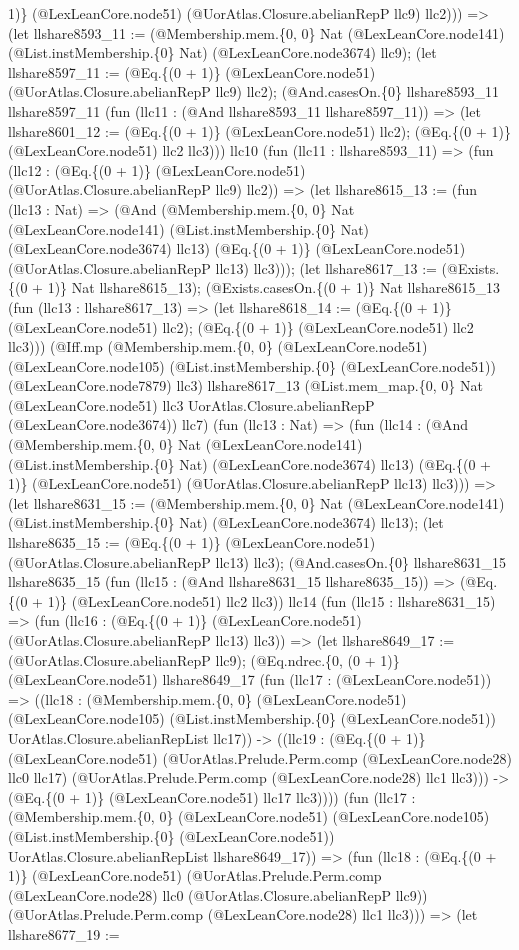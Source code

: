 \documentclass[11pt]{article}
\begin{document}
1)\} (@LexLeanCore.node51) (@UorAtlas.Closure.abelianRepP llc9) llc2))) => (let llshare8593\_11 := (@Membership.mem.\{0, 0\} Nat (@LexLeanCore.node141) (@List.instMembership.\{0\} Nat) (@LexLeanCore.node3674) llc9); (let llshare8597\_11 := (@Eq.\{(0 + 1)\} (@LexLeanCore.node51) (@UorAtlas.Closure.abelianRepP llc9) llc2); (@And.casesOn.\{0\} llshare8593\_11 llshare8597\_11 (fun (llc11 : (@And llshare8593\_11 llshare8597\_11)) => (let llshare8601\_12 := (@Eq.\{(0 + 1)\} (@LexLeanCore.node51) llc2); (@Eq.\{(0 + 1)\} (@LexLeanCore.node51) llc2 llc3))) llc10 (fun (llc11 : llshare8593\_11) => (fun (llc12 : (@Eq.\{(0 + 1)\} (@LexLeanCore.node51) (@UorAtlas.Closure.abelianRepP llc9) llc2)) => (let llshare8615\_13 := (fun (llc13 : Nat) => (@And (@Membership.mem.\{0, 0\} Nat (@LexLeanCore.node141) (@List.instMembership.\{0\} Nat) (@LexLeanCore.node3674) llc13) (@Eq.\{(0 + 1)\} (@LexLeanCore.node51) (@UorAtlas.Closure.abelianRepP llc13) llc3))); (let llshare8617\_13 := (@Exists.\{(0 + 1)\} Nat llshare8615\_13); (@Exists.casesOn.\{(0 + 1)\} Nat llshare8615\_13 (fun (llc13 : llshare8617\_13) => (let llshare8618\_14 := (@Eq.\{(0 + 1)\} (@LexLeanCore.node51) llc2); (@Eq.\{(0 + 1)\} (@LexLeanCore.node51) llc2 llc3))) (@Iff.mp (@Membership.mem.\{0, 0\} (@LexLeanCore.node51) (@LexLeanCore.node105) (@List.instMembership.\{0\} (@LexLeanCore.node51)) (@LexLeanCore.node7879) llc3) llshare8617\_13 (@List.mem\_map.\{0, 0\} Nat (@LexLeanCore.node51) llc3 UorAtlas.Closure.abelianRepP (@LexLeanCore.node3674)) llc7) (fun (llc13 : Nat) => (fun (llc14 : (@And (@Membership.mem.\{0, 0\} Nat (@LexLeanCore.node141) (@List.instMembership.\{0\} Nat) (@LexLeanCore.node3674) llc13) (@Eq.\{(0 + 1)\} (@LexLeanCore.node51) (@UorAtlas.Closure.abelianRepP llc13) llc3))) => (let llshare8631\_15 := (@Membership.mem.\{0, 0\} Nat (@LexLeanCore.node141) (@List.instMembership.\{0\} Nat) (@LexLeanCore.node3674) llc13); (let llshare8635\_15 := (@Eq.\{(0 + 1)\} (@LexLeanCore.node51) (@UorAtlas.Closure.abelianRepP llc13) llc3); (@And.casesOn.\{0\} llshare8631\_15 llshare8635\_15 (fun (llc15 : (@And llshare8631\_15 llshare8635\_15)) => (@Eq.\{(0 + 1)\} (@LexLeanCore.node51) llc2 llc3)) llc14 (fun (llc15 : llshare8631\_15) => (fun (llc16 : (@Eq.\{(0 + 1)\} (@LexLeanCore.node51) (@UorAtlas.Closure.abelianRepP llc13) llc3)) => (let llshare8649\_17 := (@UorAtlas.Closure.abelianRepP llc9); (@Eq.ndrec.\{0, (0 + 1)\} (@LexLeanCore.node51) llshare8649\_17 (fun (llc17 : (@LexLeanCore.node51)) => ((llc18 : (@Membership.mem.\{0, 0\} (@LexLeanCore.node51) (@LexLeanCore.node105) (@List.instMembership.\{0\} (@LexLeanCore.node51)) UorAtlas.Closure.abelianRepList llc17)) -> ((llc19 : (@Eq.\{(0 + 1)\} (@LexLeanCore.node51) (@UorAtlas.Prelude.Perm.comp (@LexLeanCore.node28) llc0 llc17) (@UorAtlas.Prelude.Perm.comp (@LexLeanCore.node28) llc1 llc3))) -> (@Eq.\{(0 + 1)\} (@LexLeanCore.node51) llc17 llc3)))) (fun (llc17 : (@Membership.mem.\{0, 0\} (@LexLeanCore.node51) (@LexLeanCore.node105) (@List.instMembership.\{0\} (@LexLeanCore.node51)) UorAtlas.Closure.abelianRepList llshare8649\_17)) => (fun (llc18 : (@Eq.\{(0 + 1)\} (@LexLeanCore.node51) (@UorAtlas.Prelude.Perm.comp (@LexLeanCore.node28) llc0 (@UorAtlas.Closure.abelianRepP llc9)) (@UorAtlas.Prelude.Perm.comp (@LexLeanCore.node28) llc1 llc3))) => (let llshare8677\_19 := 
\end{document}
